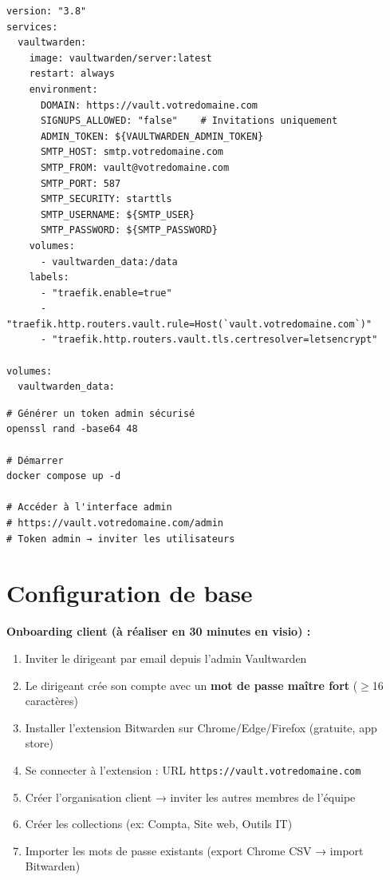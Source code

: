 \documentclass[11pt, a4paper]{article}
\begin{document}
\begin{lstlisting}[style=yamlstyle, caption={docker-compose.yml — Vaultwarden}]
version: "3.8"
services:
  vaultwarden:
    image: vaultwarden/server:latest
    restart: always
    environment:
      DOMAIN: https://vault.votredomaine.com
      SIGNUPS_ALLOWED: "false"    # Invitations uniquement
      ADMIN_TOKEN: ${VAULTWARDEN_ADMIN_TOKEN}
      SMTP_HOST: smtp.votredomaine.com
      SMTP_FROM: vault@votredomaine.com
      SMTP_PORT: 587
      SMTP_SECURITY: starttls
      SMTP_USERNAME: ${SMTP_USER}
      SMTP_PASSWORD: ${SMTP_PASSWORD}
    volumes:
      - vaultwarden_data:/data
    labels:
      - "traefik.enable=true"
      - "traefik.http.routers.vault.rule=Host(`vault.votredomaine.com`)"
      - "traefik.http.routers.vault.tls.certresolver=letsencrypt"

volumes:
  vaultwarden_data:
\end{lstlisting}

\begin{lstlisting}[style=terminal, caption={Génération du token admin et démarrage}]
# Générer un token admin sécurisé
openssl rand -base64 48

# Démarrer
docker compose up -d

# Accéder à l'interface admin
# https://vault.votredomaine.com/admin
# Token admin → inviter les utilisateurs
\end{lstlisting}

\section{Configuration de base}

\textbf{Onboarding client (à réaliser en 30 minutes en visio) :}
\begin{enumerate}
  \item Inviter le dirigeant par email depuis l'admin Vaultwarden
  \item Le dirigeant crée son compte avec un \textbf{mot de passe maître fort} ($\geq$16 caractères)
  \item Installer l'extension Bitwarden sur Chrome/Edge/Firefox (gratuite, app store)
  \item Se connecter à l'extension : URL \texttt{https://vault.votredomaine.com}
  \item Créer l'organisation client → inviter les autres membres de l'équipe
  \item Créer les collections (ex: Compta, Site web, Outils IT)
  \item Importer les mots de passe existants (export Chrome CSV → import Bitwarden)
\end{enumerate}
\end{document}
